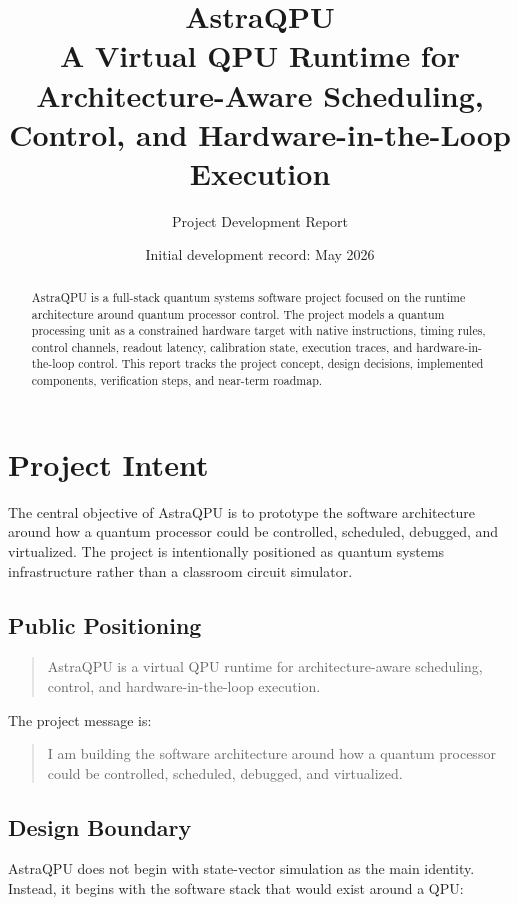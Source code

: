 \documentclass[11pt,a4paper]{article}
\title{\textbf{AstraQPU}\\
\large A Virtual QPU Runtime for Architecture-Aware Scheduling, Control, and Hardware-in-the-Loop Execution}
\author{Project Development Report}
\date{Initial development record: May 2026}
\begin{document}
\maketitle

\begin{abstract}
AstraQPU is a full-stack quantum systems software project focused on the runtime architecture around quantum processor control. The project models a quantum processing unit as a constrained hardware target with native instructions, timing rules, control channels, readout latency, calibration state, execution traces, and hardware-in-the-loop control. This report tracks the project concept, design decisions, implemented components, verification steps, and near-term roadmap.
\end{abstract}

\tableofcontents
\newpage

\section{Project Intent}

The central objective of AstraQPU is to prototype the software architecture around how a quantum processor could be controlled, scheduled, debugged, and virtualized. The project is intentionally positioned as quantum systems infrastructure rather than a classroom circuit simulator.

\subsection{Public Positioning}

\begin{quote}
AstraQPU is a virtual QPU runtime for architecture-aware scheduling, control, and hardware-in-the-loop execution.
\end{quote}

The project message is:

\begin{quote}
I am building the software architecture around how a quantum processor could be controlled, scheduled, debugged, and virtualized.
\end{quote}

\subsection{Design Boundary}

AstraQPU does not begin with state-vector simulation as the main identity. Instead, it begins with the software stack that would exist around a QPU:
\end{document}
